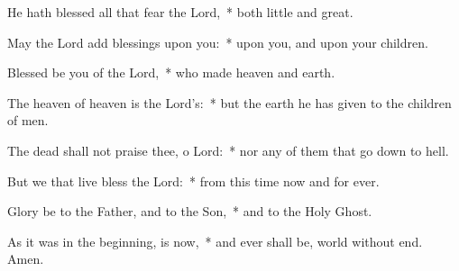 \begin{enpars}
\item  He hath blessed all that fear the Lord,~* both little and great.
\item  May the Lord add blessings upon you:~* upon you, and upon your children.
\item  Blessed be you of the Lord,~* who made heaven and earth.
\item  The heaven of heaven is the Lord’s:~* but the earth he has given to the children of men.
\item  The dead shall not praise thee, o Lord:~* nor any of them that go down to hell.
\item  But we that live bless the Lord:~* from this time now and for ever.
\item  Glory be to the Father, and to the Son,~* and to the Holy Ghost.
\item  As it was in the beginning, is now,~* and ever shall be, world without end. Amen.
\end{enpars}